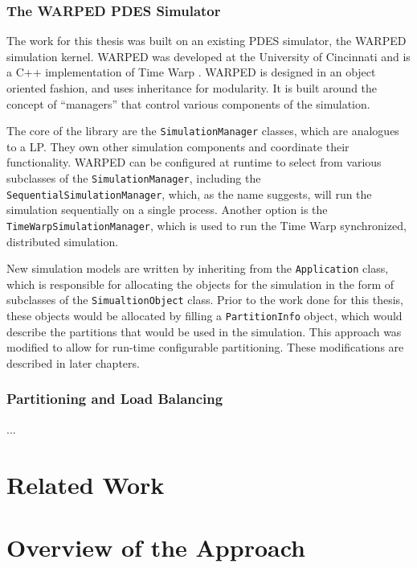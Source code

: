 \documentclass[11pt]{book}
\begin{document}
\subsection{The WARPED PDES Simulator}

The work for this thesis was built on an existing PDES simulator, the WARPED simulation kernel. WARPED was developed at the University of Cincinnati and is a C++ implementation of Time Warp \cite{king-10}.  WARPED is designed in an object oriented fashion, and uses inheritance for modularity. It is built around the concept of “managers” that control various components of the simulation. 

The core of the library are the \texttt{SimulationManager} classes, which are analogues to a LP. They own other simulation components and coordinate their functionality. WARPED can be configured at runtime to select from various subclasses of the \texttt{SimulationManager}, including the \texttt{SequentialSimulationManager}, which, as the name suggests, will run the simulation sequentially on a single process. Another option is the \texttt{TimeWarpSimulationManager}, which is used to run the Time Warp synchronized, distributed simulation. 

New simulation models are written by inheriting from the \texttt{Application} class, which is responsible for allocating the objects for the simulation in the form of subclasses of the \texttt{SimualtionObject} class. Prior to the work done for this thesis, these objects would be allocated by filling a \texttt{PartitionInfo} object, which would describe the partitions that would be used in the simulation. This approach was modified to allow for run-time configurable partitioning. These modifications are described in later chapters.

\subsection{Partitioning and Load Balancing}

...

\chapter{Related Work}\label{relatedWork}


\chapter{Overview of the Approach}\label{overview}
\end{document}
